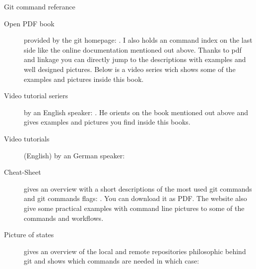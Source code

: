 \begin{description}
    \item[Git command referance] \cite{gitdoc}
    \item[Open PDF book] provided by the git homepage: \cite{Chacon2014}. I also
        holds an command index on the last side like the online documentation
        mentioned out above. Thanks to pdf and linkage you
        can directly jump to the descriptions with examples and well designed
        pictures. Below is a video series wich shows some of the examples and
        pictures inside this book.
    \item[Video tutorial seriers] by an English speaker:
        \cite{gitvideotutorial_en}. He orients on the book mentioned out above
        and gives examples and pictures you find inside this books.
    \item[Video tutorials] (English) by an German speaker:
        \cite{gitvideotutorial_de_en}
    \item[Cheat-Sheet] gives an overview with a short descriptions of the most
        used git commands and git commands flags: \cite{git_cheat_sheet}. You
        can download it as PDF. The website also give some practical examples
        with command line pictures to some of the commands and workflows.
    \item[Picture of states] gives an overview of the local and remote
        repositories philosophic behind git and shows which commands are
        needed in which case:
        \cite{git_picture}
\end{description}
